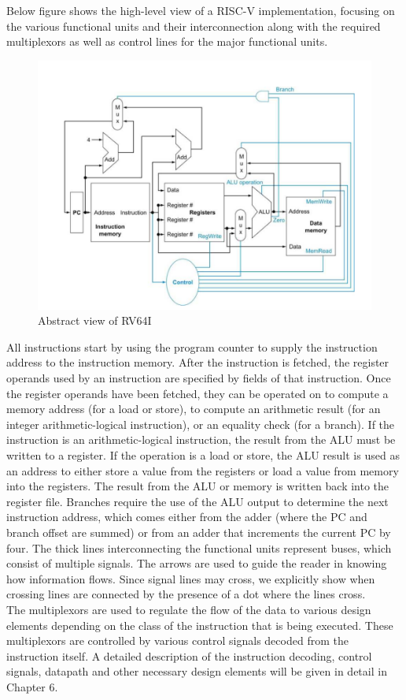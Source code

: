 \vspace{\baselineskip}
Below figure shows the high-level view of a RISC-V implementation, focusing on the various functional units and their interconnection along with the required multiplexors as well as control lines for the major functional units.
 \begin{figure}[H]
    \centering
    \includegraphics[width=0.8\linewidth]{Image/Abstract.png}
    \caption{Abstract view of RV64I}
    \label{fig:enter-label}
\end{figure}
All instructions start by using the program counter to supply the instruction address to the instruction memory. After the instruction is fetched, the register operands used by an instruction are specified by fields of that instruction. Once the register operands have been fetched, they can be operated on to compute a memory address (for a load or store), to compute an arithmetic result (for an integer arithmetic-logical instruction), or an equality check (for a branch). If the instruction is an arithmetic-logical instruction, the result from the ALU must be written to a register. If the operation is a load or store, the ALU result is used as an address to either store a value from the registers or load a value from memory into the registers. The result from the ALU or memory is written back into the register file. Branches require the use of the ALU output to determine the next instruction address, which comes either from the adder (where the PC and branch offset are summed) or from an adder that increments the current PC by four. The thick lines interconnecting the functional units represent buses, which consist of multiple signals. The arrows are used to guide the reader in knowing how information flows. Since signal lines may cross, we explicitly show when crossing lines are connected by the presence of a dot where the lines cross.\\
\vspace{\baselineskip}
The multiplexors are used to regulate the flow of the data to various design elements depending on the class of the instruction that is being executed. These multiplexors are controlled by various control signals decoded from the instruction itself. A detailed description of the instruction decoding, control signals, datapath and other necessary design elements will be given in detail in Chapter 6.